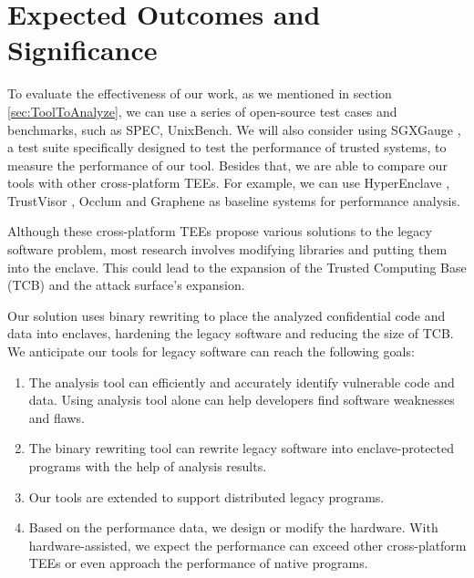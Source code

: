 \section{Expected Outcomes and Significance}
To evaluate the effectiveness of our work, as we mentioned in section
\ref{sec:ToolToAnalyze}, we can use a series of open-source test cases and benchmarks,
such as SPEC, UnixBench.
We will also consider using SGXGauge \cite{Kumar2022ACB}, a test suite specifically
designed to test the performance of trusted systems, to measure the performance
of our tool.
Besides that, we are able to compare our tools with other cross-platform TEEs.
For example, we can use HyperEnclave \cite{Jia2022HyperEnclaveAO}, TrustVisor
\cite{McCune2010TrustVisorET}, Occlum \cite{Shen2020OcclumSA} and Graphene
\cite{Tsai2017GrapheneSGXAP} as baseline systems for performance analysis.

Although these cross-platform TEEs propose various solutions to the legacy
software problem, most research involves modifying libraries and putting
them into the enclave.
This could lead to the expansion of the Trusted Computing Base (TCB)
and the attack surface's expansion.

Our solution uses binary rewriting to place the analyzed confidential code and data
into enclaves, hardening the legacy software and reducing the size of TCB.
We anticipate our tools for legacy software can reach the following goals:
\begin{enumerate}
    \item The analysis tool can efficiently and accurately identify vulnerable code and data.
    Using analysis tool alone can help developers find software weaknesses and flaws.
    \item The binary rewriting tool can rewrite legacy software into enclave-protected programs
    with the help of analysis results.
    \item Our tools are extended to support distributed legacy programs.
    \item Based on the performance data, we design or modify the hardware.
    With hardware-assisted, we expect the performance can exceed other cross-platform TEEs
    or even approach the performance of native programs.
\end{enumerate}